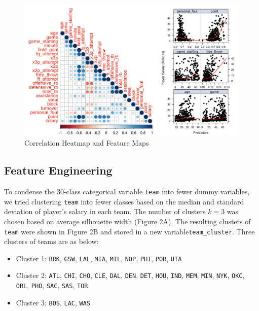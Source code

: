 \documentclass[
]{article}
\providecommand{\tightlist}{%
  \setlength{\itemsep}{0pt}\setlength{\parskip}{0pt}}
\begin{document}
\begin{figure}
\centering
\includegraphics{report_figures/figure2_combined.png}
\caption{Correlation Heatmap and Feature Maps}
\end{figure}

\hypertarget{feature-engineering}{%
\subsection{Feature Engineering}\label{feature-engineering}}

To condense the 30-class categorical variable \texttt{team} into fewer
dummy variables, we tried clustering \texttt{team} into fewer classes
based on the median and standard deviation of player's salary in each
team. The number of clusters \(k = 3\) was chosen based on average
silhouette width (Figure 2A). The resulting clusters of \texttt{team}
were shown in Figure 2B and stored in a new
variable\texttt{team\_cluster}. Three clusters of teams are as below:

\begin{itemize}
\tightlist
\item
  Cluster 1: \texttt{BRK}, \texttt{GSW}, \texttt{LAL}, \texttt{MIA},
  \texttt{MIL}, \texttt{NOP}, \texttt{PHI}, \texttt{POR}, \texttt{UTA}
\item
  Cluster 2: \texttt{ATL}, \texttt{CHI}, \texttt{CHO}, \texttt{CLE},
  \texttt{DAL}, \texttt{DEN}, \texttt{DET}, \texttt{HOU}, \texttt{IND},
  \texttt{MEM}, \texttt{MIN}, \texttt{NYK}, \texttt{OKC}, \texttt{ORL},
  \texttt{PHO}, \texttt{SAC}, \texttt{SAS}, \texttt{TOR}
\item
  Cluster 3: \texttt{BOS}, \texttt{LAC}, \texttt{WAS}
\end{itemize}
\end{document}
